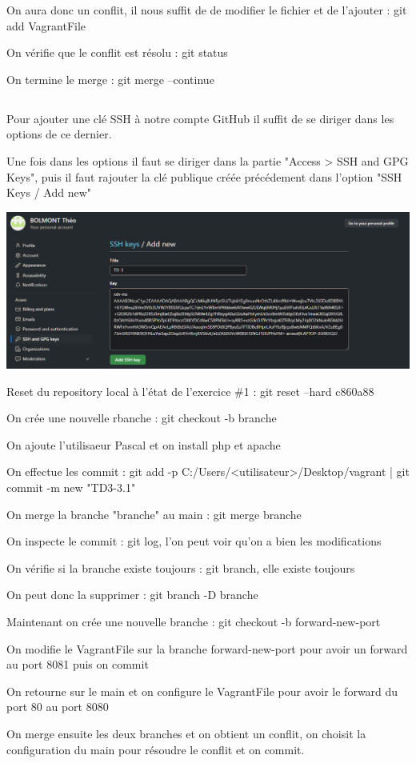 \documentclass{article}
\begin{document}
On aura donc un conflit, il nous suffit de de modifier le fichier et de l'ajouter : git add VagrantFile

On vérifie que le conflit est résolu : git status

On termine le merge : git merge --continue 

\subsection{}

Pour ajouter une clé SSH à notre compte GitHub il suffit de se diriger dans les options de ce dernier.

Une fois dans les options il faut se diriger dans la partie "Access > SSH and GPG Keys", puis il faut rajouter la clé publique créée précédement dans l'option "SSH Keys / Add new"

\begin{center}
\includegraphics[scale=0.5]{image/SSH.png}
\end{center}

Reset du repository local à l'état de l'exercice \#1 : git reset --hard c860a88

On crée une nouvelle rbanche : git checkout -b branche

On ajoute l'utilisaeur Pascal et on install php et apache

On effectue les commit : git add -p C:/Users/<utilisateur>/Desktop/vagrant | git commit -m new "TD3-3.1"

On merge la branche "branche" au main : git merge branche

On inspecte le commit : git log, l'on peut voir qu'on a bien les modifications

On vérifie si la branche existe toujours : git branch, elle existe toujours

On peut donc la supprimer : git branch -D branche

Maintenant on crée une nouvelle branche : git checkout -b forward-new-port

On modifie le VagrantFile sur la branche forward-new-port pour avoir un forward au port 8081 puis on commit

On retourne sur le main et on configure le VagrantFile pour avoir le forward du port 80 au port 8080

On merge ensuite les deux branches et on obtient un conflit, on choisit la configuration du main pour résoudre le conflit et on commit.
\end{document}

